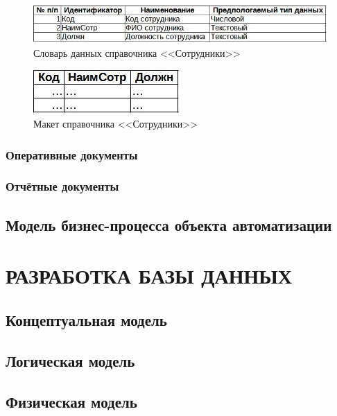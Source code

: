 \documentclass[12pt, a4paper, simple]{eskdtext}
\begin{document}
    \begin{figure}[!h]
        \centering
        \includegraphics[]
            {_docs/СД_Сотр_типы.jpg}
        \caption{Словарь данных справочника <<Сотрудники>>}
        \label{fig:cd_Sotr_tipi}
    \end{figure}

    \begin{figure}[!h]
        \centering
        \includegraphics[]
            {_docs/СД_Сотр_макет.jpg}
        \caption{Макет справочника <<Сотрудники>>}
        \label{fig:cd_Sotr_maket}
    \end{figure}

    \subsubsection{Оперативные документы}
    \subsubsection{Отчётные документы}

    \subsection{Модель бизнес-процесса объекта автоматизации}
    \newpage

    \section{РАЗРАБОТКА БАЗЫ ДАННЫХ}
    \subsection{Концептуальная модель}
    \subsection{Логическая модель}
    \subsection{Физическая модель}
    \newpage
\end{document}
